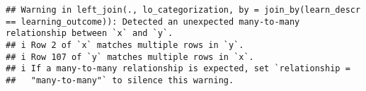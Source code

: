 \documentclass[
]{article}
\newenvironment{Shaded}{\begin{snugshade}}{\end{snugshade}}
\newcommand{\AttributeTok}[1]{\textcolor[rgb]{0.13,0.29,0.53}{#1}}
\newcommand{\FunctionTok}[1]{\textcolor[rgb]{0.13,0.29,0.53}{\textbf{#1}}}
\newcommand{\NormalTok}[1]{#1}
\newcommand{\OtherTok}[1]{\textcolor[rgb]{0.56,0.35,0.01}{#1}}
\newcommand{\SpecialCharTok}[1]{\textcolor[rgb]{0.81,0.36,0.00}{\textbf{#1}}}
\begin{document}
\begin{verbatim}
## Warning in left_join(., lo_categorization, by = join_by(learn_descr == learning_outcome)): Detected an unexpected many-to-many relationship between `x` and `y`.
## i Row 2 of `x` matches multiple rows in `y`.
## i Row 107 of `y` matches multiple rows in `x`.
## i If a many-to-many relationship is expected, set `relationship =
##   "many-to-many"` to silence this warning.
\end{verbatim}

\begin{Shaded}
\end{Shaded}
\end{document}
